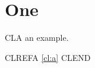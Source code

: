 \documentclass[11pt]{report}
\begin{document}
\chapter{One}
\begin{exe}
\ex\label{cl:a} CLA an example.
\end{exe}

CLREFA \ref{cl:a} CLEND
\end{document}
